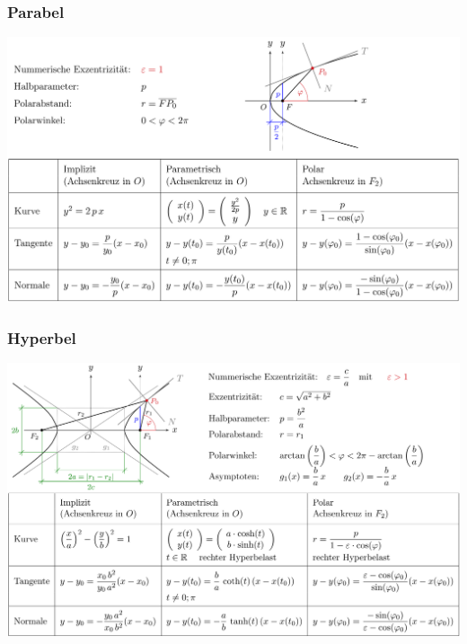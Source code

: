 	\subsubsection{Parabel {}} %
		\includegraphics[width=1\textwidth]{bilder/parabel.png}
	\subsubsection{Hyperbel {}} %
		\includegraphics[width=1\textwidth]{bilder/hyperbel.png}


